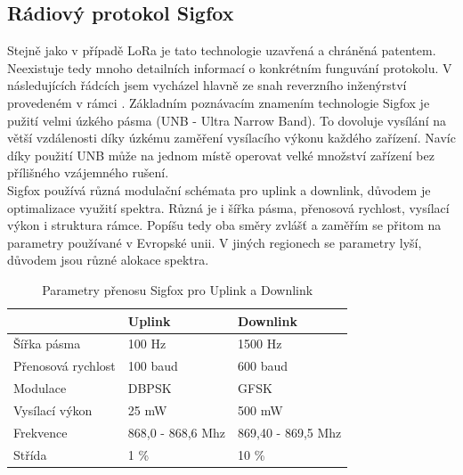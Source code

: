 \documentclass{ctuthesis}
\begin{document}
\subsection{Rádiový protokol Sigfox}
Stejně jako v případě LoRa je tato technologie uzavřená a chráněná patentem. Neexistuje tedy mnoho detailních informací o konkrétním funguvání protokolu. V následujících řádcích jsem vycházel hlavně ze snah reverzního inženýrství provedeném v rámci \cite{sigfoxprotocol}.
Základním poznávacím znamením technologie Sigfox je pužití velmi úzkého pásma (UNB - Ultra Narrow Band). To dovoluje vysílání na větší vzdálenosti díky úzkému zaměření vysílacího výkonu každého zařízení. Navíc díky použití UNB může na jednom místě operovat velké množství zařízení bez přílišného vzájemného rušení. \\
Sigfox používá různá modulační schémata pro uplink a downlink, důvodem je optimalizace využití spektra. Různá je i šířka pásma, přenosová rychlost, vysílací výkon i struktura rámce. Popíšu tedy oba směry zvlášť a zaměřím se přitom na parametry používané v Evropské unii. V jiných regionech se parametry lyší, důvodem jsou různé alokace spektra.

\begin{table}[]
\begin{tabular}{@{}ll|l@{}}
\toprule
                   & Uplink            & Downlink           \\ \midrule
Šířka pásma        & 100 Hz            & 1500 Hz            \\
Přenosová rychlost & 100 baud          & 600 baud           \\
Modulace           & DBPSK             & GFSK               \\
Vysílací výkon     & 25 mW             & 500 mW             \\
Frekvence          & 868,0 - 868,6 Mhz & 869,40 - 869,5 Mhz \\
Střída             & 1 \%              & 10 \%             
\end{tabular}
\caption{Parametry přenosu Sigfox pro Uplink a Downlink}
\label{tab:upAndDown}
\cite{sigfoxsystem}
\end{table}
\end{document}
